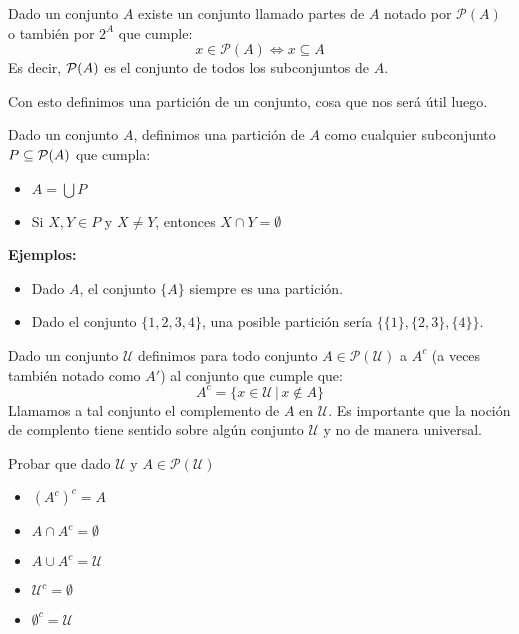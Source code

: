 \documentclass[12pt,a4paper]{book}
\begin{document}
\begin{prop}
Dado un conjunto $A$ existe un conjunto llamado partes de $A$ notado por $ \mathcal{P}(A)$ o también por $2^A$ que cumple:
$$ x \in \mathcal{P}(A) \Leftrightarrow x \subseteq A $$
Es decir, $\P(A)$ es el conjunto de todos los subconjuntos de $A$.
\end{prop}

Con esto definimos una partición de un conjunto, cosa que nos será útil luego.

\begin{defi} %
Dado un conjunto $A$, definimos una partición de $A$ como cualquier subconjunto $P \subseteq \P(A)$ que cumpla:
\begin{itemize}
\item $ A = \bigcup P$
\item Si $X,Y \in P$ y $X \neq Y$, entonces $X \cap Y = \emptyset$
\end{itemize}
\end{defi}

\textbf{Ejemplos:}
\begin{itemize}
\item Dado $A$, el conjunto $\{A\}$ siempre es una partición. 
\item Dado el conjunto $\{ 1, 2, 3, 4\}$, una posible partición sería $\{\{1\},\{2,3\},\{4\}\}$.
\end{itemize}

\begin{defi} %
Dado un conjunto $\mathcal{U}$ definimos para todo conjunto $A \in \mathcal{P}(\mathcal{U})$ a $A^c$ (a veces también notado como $A'$) al conjunto que cumple que: $$ A^c = \lbrace x \in \mathcal{U} \,\vert\, x \notin A \rbrace $$
Llamamos a tal conjunto el complemento de $A$ en $ \mathcal{U}$. Es importante que la noción de complento tiene sentido sobre algún conjunto $\mathcal{U}$ y no de manera universal.
\end{defi}

\begin{ej} %
Probar que dado $\mathcal{U}$ y $ A \in \mathcal{P}(\mathcal{U}) $ 
\begin{itemize}
\item $(A^c)^c = A $
\item $A \cap A^c = \emptyset $
\item $A \cup A^c = \mathcal{U}$
\item $\mathcal{U}^c = \emptyset$
\item $\emptyset^c = \mathcal{U}$
\end{itemize}
\end{ej}
\end{document}
